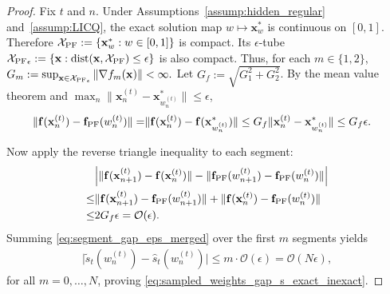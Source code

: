 \documentclass{article}
\newcommand{\Oc}{\mathcal{O}}
\newcommand{\bx}{\mathbf{x}}
\newcommand{\XPF}{{\mathcal{X}_{\rm PF}}}
\newcommand{\f}{\mathbf{f}}
\newcommand{\fPF}{{\mathbf{f}_{\rm PF}}}
\newcommand{\dist}{\operatorname{dist}}
\begin{document}
\begin{proof}
Fix $t$ and $n$. Under Assumptions~\ref{assump:hidden_regular} and~\ref{assump:LICQ}, the exact solution map
$w\mapsto \bx_w^*$ is continuous on $[0,1]$. Therefore $\XPF:=\{\bx_w^*:w\in[0,1]\}$ is compact. Its $\epsilon$-tube $\XPF_{\epsilon}:=\{\bx:\dist(\bx,\XPF)\le \epsilon\}$ is also compact. Thus, for each $m\in\{1,2\}$, $G_m:=\sup_{\bx\in \XPF_{\epsilon}}\|\nabla f_m(\bx)\| < \infty.$ Let $G_f:=\sqrt{G_1^2+G_2^2}$. By the mean value theorem and $\max_n\|\bx_n^{(t)}-\bx_{w_n^{(t)}}^*\|\leq \epsilon$,
\begin{align}
\|\f(\bx_n^{(t)})-\fPF(w_n^{(t)})\| = & \|\f(\bx_n^{(t)})-\f(\bx_{w_n^{(t)}}^*)\| \le G_f \|\bx_n^{(t)}-\bx_{w_n^{(t)}}^*\| \le G_f\epsilon.
\label{eq:f_gap_from_dist_gap}
\end{align}

Now apply the reverse triangle inequality to each segment:
\begin{align}
&\Big| \|\f(\bx_{n+1}^{(t)})-\f(\bx_n^{(t)})\| - \|\fPF(w_{n+1}^{(t)})-\fPF(w_n^{(t)})\| \Big| \nonumber\\
\le& \|\f(\bx_{n+1}^{(t)})-\fPF(w_{n+1}^{(t)})\| + \|\f(\bx_n^{(t)})-\fPF(w_n^{(t)})\| \nonumber\\
\le& 2G_f\epsilon = \Oc(\epsilon). \label{eq:segment_gap_eps_merged}
\end{align}
Summing \eqref{eq:segment_gap_eps_merged} over the first $m$ segments yields
\begin{align}
\big|\tilde s_t(w_n^{(t)})-\hat s_t(w_n^{(t)})\big| \le m\cdot \Oc(\epsilon) = \Oc(N\epsilon),
\end{align}
for all $m=0,\dots,N$, proving \eqref{eq:sampled_weights_gap_s_exact_inexact}.


\end{proof}
\end{document}
